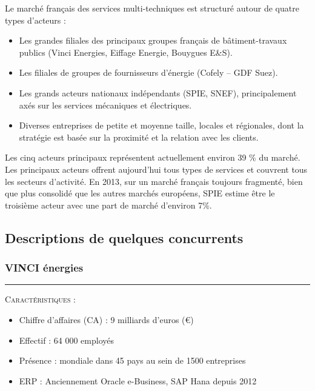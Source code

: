 Le marché français des services multi-techniques est structuré autour de quatre types d’acteurs :
\begin{itemize}
    \item Les grandes filiales des principaux groupes français de bâtiment-travaux publics (Vinci Energies, Eiffage Energie, Bouygues E\&S). 
    \item Les filiales de groupes de fournisseurs d’énergie (Cofely – GDF Suez).
    \item Les grands acteurs nationaux indépendants (SPIE, SNEF), principalement axés sur les services mécaniques et électriques.
    \item Diverses entreprises de petite et moyenne taille, locales et régionales, dont la stratégie est basée sur la proximité et la relation avec les clients. \\
\end{itemize}

Les cinq acteurs principaux représentent actuellement environ 39 \% du marché. Les principaux acteurs offrent aujourd’hui tous types de services et couvrent tous les secteurs d’activité. En 2013, sur un marché français toujours fragmenté, bien que plus consolidé que les autres marchés européens, SPIE estime être le troisième acteur avec une part de marché d’environ 7\%.

\subsection{Descriptions de quelques concurrents}
 
\subsubsection{VINCI énergies}
\hrule

\begin{shaded}
    \noindent\textsc{Caractéristiques} : \\
    \begin{itemize}
        \item Chiffre d'affaires (CA) : 9 milliards d'euros (€)
        \item Effectif : 64 000 employés
        \item Présence : mondiale dans 45 pays au sein de 1500 entreprises
        \item ERP : Anciennement Oracle e-Business, SAP Hana depuis 2012\\
    \end{itemize}
\end{shaded}

